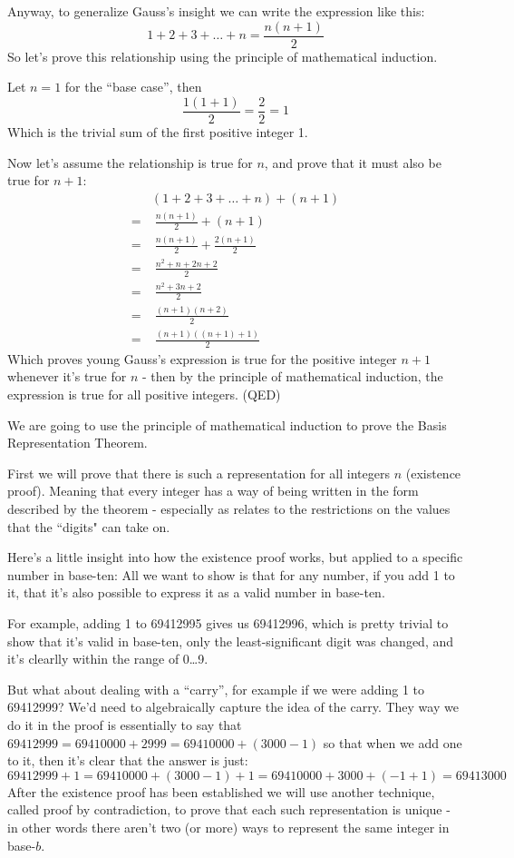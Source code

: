 \documentclass{article}
\begin{document}
Anyway,
to generalize Gauss's insight we can write the expression like this:
\[1+2+3+\ldots+n=\frac{n(n+1)}{2}\]
So let's prove this relationship using the principle of mathematical induction.
\bigskip

Let $n=1$ for the ``base case'',
then
\[\frac{1(1+1)}{2}=\frac{2}{2}=1\]
Which is the trivial sum of the first positive integer 1.
\bigskip

Now let's assume the relationship is true for $n$,
and prove that it must also be true for $n+1$:
\begin{align*}
&(1+2+3+\ldots+n) + (n+1)\\
= & \; \frac{n(n+1)}{2} + (n+1)\\
= & \; \frac{n(n+1)}{2} + \frac{2(n+1)}{2}\\
= & \; \frac{n^2+n+2n+2}{2}\\
= & \; \frac{n^2+3n+2}{2}\\
= & \; \frac{(n+1)(n+2)}{2}\\
= & \; \frac{(n+1)((n+1)+1)}{2}
\end{align*}
Which proves young Gauss's expression is true for
the positive integer $n+1$ whenever it's true for $n$ - then
by the principle of mathematical induction,
the expression is true for all positive integers. (QED)

\break
We are going to use the principle of mathematical induction to prove the Basis Representation Theorem.

First we will prove that there is such a representation for all
integers $n$ (existence proof).
Meaning that every integer has a way of being written
in the form described by the theorem - especially as
relates to the restrictions on the values that the ``digits" can take on.

Here's a little insight into how the existence proof works, but applied to a specific number in base-ten:
All we want to show is that for any number, if you add 1 to it, that it's also possible to express it as a valid number in base-ten.

For example, adding 1 to 69412995 gives us 69412996, which is pretty trivial to show that it's valid in base-ten, only the least-significant digit was
changed, and it's clearlly within the range of 0\dots{}9.

But what about dealing with a ``carry'', for example 
if we were adding 1 to 69412999? We'd need to algebraically capture the idea of the carry.  They way
we do it in the proof is essentially to say that $69412999 = 69410000 + 2999 = 69410000 + (3000-1)$ so that when we add one to it, then
it's clear that the answer is just:
\[69412999 + 1 = 69410000 + (3000-1) + 1 = 69410000 + 3000 + (-1 + 1) = 69413000\]
After the existence proof has been established we will use another technique, called proof by contradiction,
to prove that each such representation is unique - in other
words there aren't two (or more) ways to represent the same integer in base-$b$.
\end{document}
